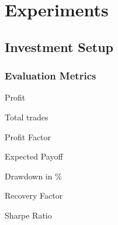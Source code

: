 \section{Experiments}

\subsection{Investment Setup}

\subsubsection{Evaluation Metrics}
Profit

Total trades

Profit Factor

Expected Payoff

Drawdown in \%

Recovery Factor

Sharpe Ratio





